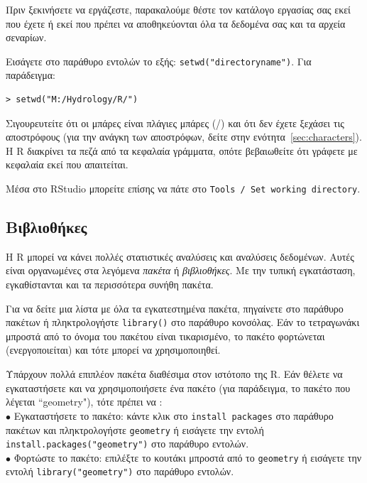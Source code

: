 \documentclass[a4paper,10pt,twocolumn]{article}
\begin{document}
Πριν ξεκινήσετε να εργάζεστε, παρακαλούμε θέστε τον κατάλογο εργασίας σας εκεί που έχετε ή εκεί που πρέπει
να αποθηκεύονται όλα τα δεδομένα σας και τα αρχεία σεναρίων.

Εισάγετε στο παράθυρο εντολών το εξής: \verb!setwd("directoryname")!. Για παράδειγμα:
\begin{Verbatim}[frame=single,gobble=0]
> setwd("M:/Hydrology/R/")
\end{Verbatim}
Σιγουρευτείτε ότι οι μπάρες είναι πλάγιες μπάρες (/) και ότι δεν έχετε ξεχάσει τις αποστρόφους (για την ανάγκη
των αποστρόφων, δείτε στην ενότητα~\ref{sec:characters}). Η R διακρίνει τα πεζά από τα κεφαλαία γράμματα, οπότε
βεβαιωθείτε ότι γράφετε με κεφαλαία εκεί που απαιτείται.

Μέσα στο RStudio μπορείτε επίσης να πάτε στο \texttt{Tools / Set working directory}.

\subsection{Βιβλιοθήκες} 

Η R μπορεί να κάνει πολλές στατιστικές αναλύσεις και αναλύσεις δεδομένων. Αυτές είναι οργανωμένες στα 
λεγόμενα \emph{πακέτα} ή \emph{βιβλιοθήκες}. Με την τυπική εγκατάσταση, εγκαθίστανται και τα περισσότερα
συνήθη πακέτα. 

Για να δείτε μια λίστα με όλα τα εγκατεστημένα πακέτα, πηγαίνετε στο παράθυρο πακέτων ή πληκτρολογήστε 
\verb!library()! στο παράθυρο κονσόλας. Εάν το τετραγωνάκι μπροστά από το όνομα του πακέτου είναι τικαρισμένο,
το πακέτο φορτώνεται (ενεργοποιείται) και τότε μπορεί να χρησιμοποιηθεί. 

Υπάρχουν πολλά επιπλέον πακέτα διαθέσιμα στον ιστότοπο της R. Εάν θέλετε να εγκαταστήσετε και να χρησιμοποιήσετε
ένα πακέτο (για παράδειγμα, το πακέτο που λέγεται ``geometry"), τότε πρέπει να :\\
\noindent $\bullet$ Εγκαταστήσετε το πακέτο:  κάντε κλικ στο \texttt{install packages} στο παράθυρο πακέτων
και πληκτρολογήστε \texttt{geometry} ή εισάγετε την εντολή \verb!install.packages("geometry")! στο παράθυρο
εντολών.\\
\noindent $\bullet$ Φορτώστε το πακέτο: επιλέξτε το κουτάκι μπροστά από το \texttt{geometry} ή εισάγετε
την εντολή \verb!library("geometry")! στο παράθυρο εντολών.


\end{document}
